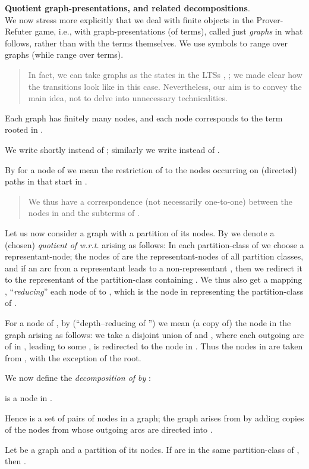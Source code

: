 \documentclass{llncs}
\begin{document}
\textbf{Quotient graph-presentations, and related decompositions}.
\\
We now stress more explicitly that
we deal with finite objects in the Prover-Refuter game, i.e., with 
graph-presentations (of terms),
called just \emph{graphs} in what follows, rather than 
with the terms themselves. We
use  symbols   to range over graphs
(while  range over terms).
\begin{quote}
	{\small
 In fact, we can take graphs as the states in
the LTSs ,
;
we made clear how the transitions look like in this case.
Nevertheless, our aim is to convey the main idea, not 
to delve into unnecessary technicalities.
}
\end{quote}
Each graph  has finitely many nodes,
and 
each node  corresponds to the term  rooted in
. 

We write shortly 
instead of ; 
similarly
we write  
instead of .

By  for a node  of  we mean the
restriction of  to the nodes occurring on (directed) paths in
 that start in . 
\begin{quote}
	{\small
We thus have a correspondence (not necessarily one-to-one)
between 
the nodes in  and the subterms of .
}
\end{quote}
Let us now consider a graph  with a partition  of
its nodes. By  we denote a (chosen)
\emph{quotient of}  \emph{w.r.t.
} arising as follows: In each partition-class of  
we choose a
representant-node; the nodes
of  are the representant-nodes of all partition
classes, and if an arc from a representant leads to a
non-representant , then we redirect it to the
representant  of the partition-class containing
.
We thus also get a mapping , ``\emph{reducing}'' each node
 of  to , which is the node in
 representing the partition-class of .


For a node  of , by 
(``depth--reducing of '') we mean (a copy of)
the node  in the
graph arising as follows: we take a disjoint union of  and
, where  
each outgoing arc of  in , leading to 
some , is redirected to the node  in 
. Thus the nodes in  are taken
from , with the exception of the root. 

We now define the \emph{decomposition of  by }:
\begin{center}
 is a
node in .
\end{center}
Hence  is a set of pairs of nodes in a graph; the graph
arises from
 by adding copies of the nodes from  whose outgoing
arcs are directed into .

\begin{proposition}\label{prop:declowerEL}
Let  be a graph and  a partition of its nodes.
If  are in the same
partition-class of , then
.
\end{proposition}	
\end{document}
